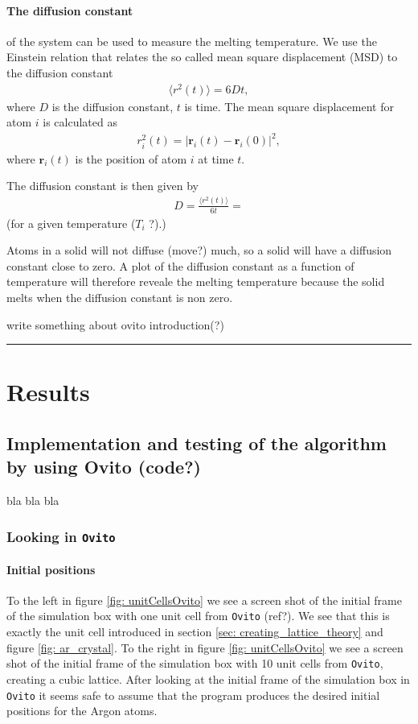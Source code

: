 \documentclass[11pt,a4wide]{article}
\renewcommand{\vec}{\mathbf}
\begin{document}
\paragraph{The diffusion constant} of the system can be used to measure the melting temperature. We use the Einstein relation that relates the so called mean square displacement (MSD) to the diffusion constant
\begin{align}
	\langle r^2(t) \rangle = 6Dt,
\end{align}
where $D$ is the diffusion constant, $t$ is time. The mean square displacement for atom $i$ is calculated as
\begin{align}
	r_i^2(t) = |\vec r_i(t) - \vec r_i(0)|^2,
\end{align}
where $\vec r_i(t)$ is the position of atom $i$ at time $t$. 

The diffusion constant is then given by
\begin{align*}
D = \frac{\langle r^2(t) \rangle}{6t} = 
\end{align*}
(for a given temperature ($T_i$ ?).)

Atoms in a solid will not diffuse (move?) much, so a solid will have a diffusion constant close to zero. A plot of the diffusion constant as a function of temperature will therefore reveale the melting temperature because the solid melts when the diffusion constant is non zero.

write something about ovito introduction(?)

\rule{0.3\textwidth}{0.4pt}\par %


\section{Results} %

\subsection{Implementation and testing of the algorithm by using Ovito (code?)}
bla bla bla

\subsubsection*{Looking in \texttt{Ovito}}
\paragraph{Initial positions}
To the left in figure \ref{fig: unitCellsOvito} we see a screen shot of the initial frame of the simulation box with one unit cell from \texttt{Ovito} (ref?). We see that this is exactly the unit cell introduced in section \ref{sec: creating_lattice_theory} and figure \ref{fig: ar_crystal}. To the right in figure \ref{fig: unitCellsOvito} we see a screen shot of the initial frame of the simulation box with 10 unit cells from \texttt{Ovito}, creating a cubic lattice. After looking at the initial frame of the simulation box in \texttt{Ovito} it seems safe to assume that the program produces the desired initial positions for the Argon atoms. 
\end{document}
